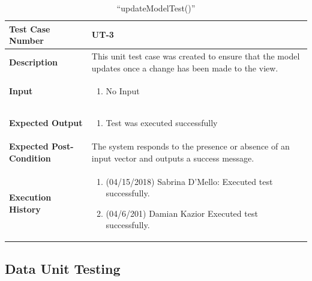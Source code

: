 \documentclass[12pt]{article}
\begin{document}
\begin{table}[H]
\caption{“updateModelTest()”}
\begin{center}
\begin{tabular}{|p{5.5cm}|p{11cm}|}
  \hline
  \bf Test Case Number & UT-3\\\hline
  \bf Description & 
  This unit test case was created to ensure that the model  updates once a change has been made to the view.\\\hline
  \bf Input &
  \begin{enumerate}
  \item No Input
  \end{enumerate}
  \\\hline
  \bf Expected Output &
  \begin{enumerate}
  \item Test was executed successfully
  \end{enumerate}
  \\\hline
  \bf Expected Post-Condition & 
  The system responds to the presence or absence of an input vector and outputs a success message.
  \\\hline   
  \bf Execution History & 
  \begin{enumerate}
  \item (04/15/2018) Sabrina D’Mello: Executed test successfully.
  \item (04/6/201) Damian Kazior Executed test successfully.
  \end{enumerate}
  \\\hline
\end{tabular}
\end{center}
\end{table}


\subsection{Data Unit Testing} \label{ut:2}
\end{document}
